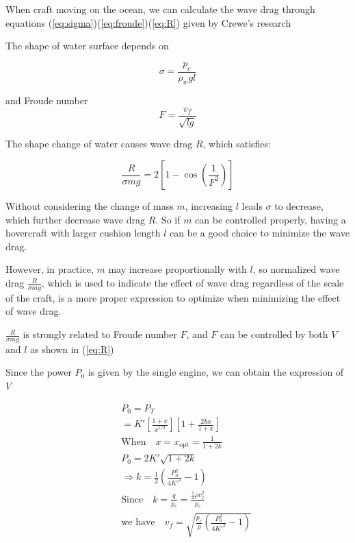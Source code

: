 When craft moving on the ocean, we can calculate the wave drag through equations (\ref{eq:sigma})(\ref{eq:froude})(\ref{eq:R}) given by Crewe's research\cite{crewe1960hovercraft}

The shape of water surface depends on

\begin{equation}
\sigma = \frac{p_{c}}{\rho_{w}gl} \label{eq:sigma}
\end{equation}

and Froude number 
\begin{equation}
F = \frac{v_f}{\sqrt{lg}} \label{eq:froude}
\end{equation}

The shape change of water causes wave drag $R$, which satisfies:

\begin{equation}
\frac{R}{\sigma mg} = 2\left[1 - \cos\left(\frac{1}{F^{2}}\right)\right] \label{eq:R}
\end{equation}

Without considering the change of mass $m$, increasing $l$ leads $\sigma$ to decrease, which further decrease wave drag $R$. So if $m$ can be controlled properly, having a hovercraft with larger cushion length $l$ can be a good choice to minimize the wave drag.

However, in practice, $m$ may increase proportionally with $l$, so normalized wave drag $\frac{R}{\sigma mg}$, which is used to indicate the effect of wave drag regardless of the scale of the craft, is a more proper expression to optimize when minimizing the effect of wave drag.

$\frac{R}{\sigma mg}$ is strongly related to Froude number $F$, and $F$ can be controlled by both $V$ and $l$ as shown in (\ref{eq:R})

Since the power $P_0$ is given by the single engine, we can obtain the expression of $V$

\begin{align}
\quad&P_0 = P_T \\
&= K'\left[ \frac{1+x}{x^{1/2}} \right] \left[ 1 + \frac{2kx}{1+x} \right] \\
&\text{When} \quad x = x_{\mathrm{opt}} = \frac{1}{1+2k} \\
&P_0 = 2K'\sqrt{1 + 2k} \\
&\Rightarrow k = \frac{1}{2} \left( \frac{P_0^2}{4K'^2} - 1 \right) \\
&\text{Since} \quad k = \frac{q}{p_c} = \frac{\frac{1}{2}\rho v_f^2}{p_c} \\
&\text{we have} \quad v_f = \sqrt{ \frac{p_c}{\rho} \left( \frac{P_0^2}{4K'^2} - 1 \right) } \label{eq:V}
\end{align}

